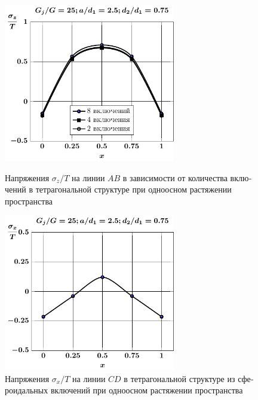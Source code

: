 \begin{russian}
\begin{figure}[h!]
\centering\footnotesize
\parbox[b]{7.5cm}{\centering\includegraphics[width=7.5cm]{inc8-4-2-a25-d75-g25-sig_z-spheroids-tension1.pdf}
\caption{Напряжения $\sigma_z/T$ на линии $AB$ в зависимости от количества включений в тетрагональной структуре при одноосном растяжении пространства
\label{f:9:19}}}\hfil\hfil
\parbox[b]{7.5cm}{\centering\includegraphics[width=7.5cm]{inc8-a25-d75-g25-c-c-sig_x-spheroids-tension1.pdf}
\caption{Напряжения $\sigma_x/T$ на линии $CD$ в тетрагональной структуре из сфероидальных включений при одноосном растяжении пространства
\label{f:9:20}}}
\end{figure}

%


\end{russian}
